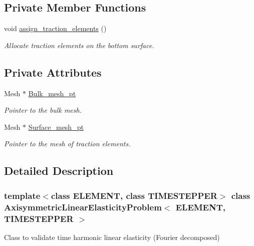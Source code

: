 \subsection*{Private Member Functions}
\begin{DoxyCompactItemize}
\item 
void \hyperlink{classAxisymmetricLinearElasticityProblem_ab0cfde2632d6711b75744bcc2644ae04}{assign\+\_\+traction\+\_\+elements} ()
\begin{DoxyCompactList}\small\item\em Allocate traction elements on the bottom surface. \end{DoxyCompactList}\end{DoxyCompactItemize}
\subsection*{Private Attributes}
\begin{DoxyCompactItemize}
\item 
Mesh $\ast$ \hyperlink{classAxisymmetricLinearElasticityProblem_a49f2e786217cf28ebed1d828a4b06147}{Bulk\+\_\+mesh\+\_\+pt}
\begin{DoxyCompactList}\small\item\em Pointer to the bulk mesh. \end{DoxyCompactList}\item 
Mesh $\ast$ \hyperlink{classAxisymmetricLinearElasticityProblem_a62a8248651ee5b17b5168fe9158039dc}{Surface\+\_\+mesh\+\_\+pt}
\begin{DoxyCompactList}\small\item\em Pointer to the mesh of traction elements. \end{DoxyCompactList}\end{DoxyCompactItemize}


\subsection{Detailed Description}
\subsubsection*{template$<$class E\+L\+E\+M\+E\+NT, class T\+I\+M\+E\+S\+T\+E\+P\+P\+ER$>$\newline
class Axisymmetric\+Linear\+Elasticity\+Problem$<$ E\+L\+E\+M\+E\+N\+T, T\+I\+M\+E\+S\+T\+E\+P\+P\+E\+R $>$}

Class to validate time harmonic linear elasticity (Fourier decomposed) 

